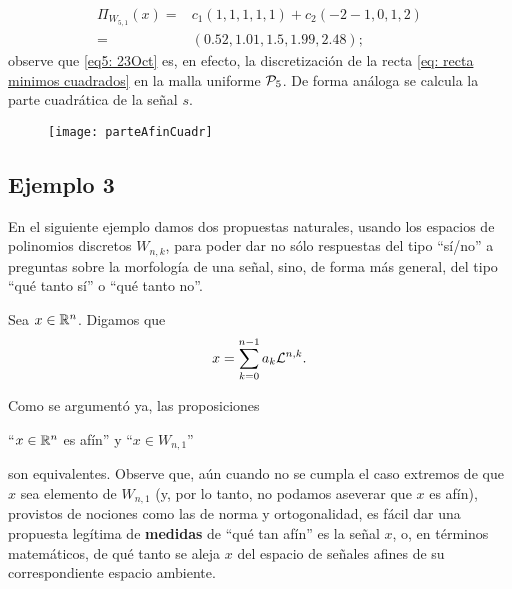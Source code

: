{\begin{align}
\label{eq5: 23Oct}
\Pi_{W_{5,1}}(x) =& c_{1} (1,1,1,1,1) + c_{2}(-2-1,0,1,2) \nonumber \\
= & (0.52, 1.01, 1.5, 1.99, 2.48 );
\end{align}
observe que \eqref{eq5: 23Oct} es, 
en efecto, la discretización de 
la recta \eqref{eq: recta minimos cuadrados}
en la malla uniforme $\mathcal{P}_{5}$.
De forma análoga se calcula la parte cuadrática de
la señal $s$.

\begin{figure}[H]
	\centering
	\texttt{[image: parteAfinCuadr]}
\end{figure}	





\subsection{Ejemplo 3}
\label{subs: ejm 3}

En el siguiente ejemplo 
damos dos propuestas naturales,
usando los espacios de polinomios discretos $W_{n,k}$,
para poder dar no sólo respuestas del tipo
``sí/no'' a preguntas sobre la morfología de una señal, sino,
de forma más general, del tipo ``qué tanto sí'' o
``qué tanto no''.




Sea $x \in \mathbb{R}^{n}$. Digamos que 
\[
x = \sum\limits_{k=0}^{n-1}a_{k} \mathcal{L}^{n, k}.
\]


Como se argumentó ya, las proposiciones
\begin{center}
``$x \in \mathbb{R}^{n}$ es afín'' \hspace{0.2cm} y \hspace{0.2cm} 
``$x \in W_{n,1}$''
\end{center} 
son equivalentes.
Observe que, aún cuando no se cumpla el caso
extremos de que $x$ sea elemento 
de $W_{n,1}$ (y, por lo tanto, no podamos aseverar que
$x$ es afín), provistos
de nociones como las de norma y ortogonalidad, es fácil dar 
una propuesta legítima de
\textbf{medidas} de ``qué tan afín'' es la señal $x$,
o, en términos matemáticos, de qué tanto se aleja
$x$ del espacio de señales afines de su correspondiente
espacio ambiente.

}
